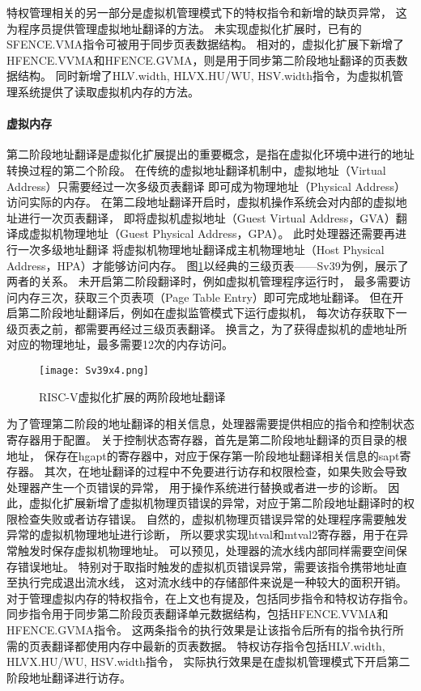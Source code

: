 特权管理相关的另一部分是虚拟机管理模式下的特权指令和新增的缺页异常，
这为程序员提供管理虚拟地址翻译的方法。
未实现虚拟化扩展时，已有的SFENCE.VMA指令可被用于同步页表数据结构。
相对的，虚拟化扩展下新增了HFENCE.VVMA和HFENCE.GVMA，则是用于同步第二阶段地址翻译的页表数据结构。
同时新增了HLV.width, HLVX.HU/WU, HSV.width指令，为虚拟机管理系统提供了读取虚拟机内存的方法。

\paragraph{虚拟内存}
第二阶段地址翻译是虚拟化扩展提出的重要概念，是指在虚拟化环境中进行的地址转换过程的第二个阶段。
在传统的虚拟地址翻译机制中，虚拟地址（Virtual Address）只需要经过一次多级页表翻译
即可成为物理地址（Physical Address）访问实际的内存。
在第二段地址翻译开启时，虚拟机操作系统会对内部的虚拟地址进行一次页表翻译，
即将虚拟机虚拟地址（Guest Virtual Address，GVA）翻译成虚拟机物理地址（Guest Physical Address，GPA）。
此时处理器还需要再进行一次多级地址翻译
将虚拟机物理地址翻译成主机物理地址（Host Physical Address，HPA）才能够访问内存。
图\ref*{fig:Sv39x4}以经典的三级页表——Sv39为例，展示了两者的关系。
未开启第二阶段翻译时，例如虚拟机管理程序运行时，
最多需要访问内存三次，获取三个页表项（Page Table Entry）即可完成地址翻译。
但在开启第二阶段地址翻译后，例如在虚拟监管模式下运行虚拟机，
每次访存获取下一级页表之前，都需要再经过三级页表翻译。
换言之，为了获得虚拟机的虚地址所对应的物理地址，最多需要12次的内存访问。

\begin{figure}[htbp]
    \centering
    \texttt{[image: Sv39x4.png]}
    \caption{RISC-V虚拟化扩展的两阶段地址翻译}
    \label{fig:Sv39x4}
\end{figure}

为了管理第二阶段的地址翻译的相关信息，处理器需要提供相应的指令和控制状态寄存器用于配置。
关于控制状态寄存器，首先是第二阶段地址翻译的页目录的根地址，
保存在hgapt的寄存器中，对应于保存第一阶段地址翻译相关信息的sapt寄存器。
其次，在地址翻译的过程中不免要进行访存和权限检查，如果失败会导致处理器产生一个页错误的异常，
用于操作系统进行替换或者进一步的诊断。
因此，虚拟化扩展新增了虚拟机物理页错误的异常，对应于第二阶段地址翻译时的权限检查失败或者访存错误。
自然的，虚拟机物理页错误异常的处理程序需要触发异常的虚拟机物理地址进行诊断，
所以要求实现htval和mtval2寄存器，用于在异常触发时保存虚拟机物理地址。
可以预见，处理器的流水线内部同样需要空间保存错误地址。
特别对于取指时触发的虚拟机页错误异常，需要该指令携带地址直至执行完成退出流水线，
这对流水线中的存储部件来说是一种较大的面积开销。
对于管理虚拟内存的特权指令，在上文也有提及，包括同步指令和特权访存指令。
同步指令用于同步第二阶段页表翻译单元数据结构，包括HFENCE.VVMA和HFENCE.GVMA指令。
这两条指令的执行效果是让该指令后所有的指令执行所需的页表翻译都使用内存中最新的页表数据。
特权访存指令包括HLV.width, HLVX.HU/WU, HSV.width指令，
实际执行效果是在虚拟机管理模式下开启第二阶段地址翻译进行访存。

